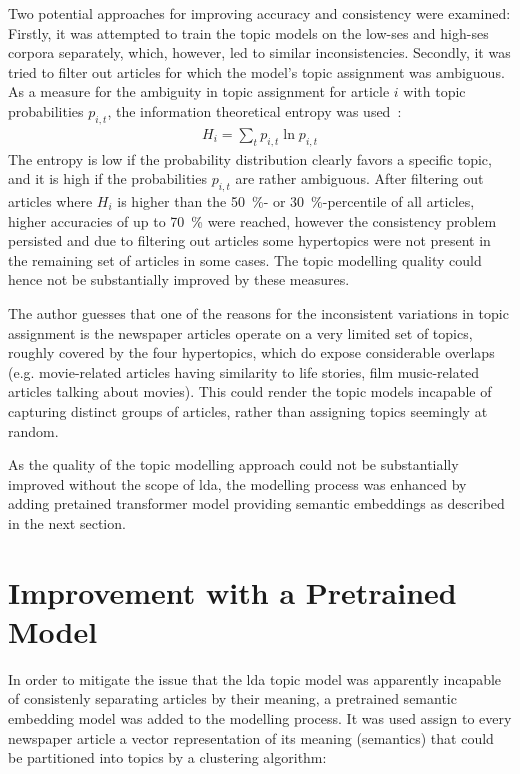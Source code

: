 Two potential approaches for improving accuracy and consistency were examined: Firstly, it was attempted to train the topic models on the low-\gls{ses} and high-\gls{ses} corpora separately, which, however, led to similar inconsistencies. Secondly, it was tried to filter out articles for which the model's topic assignment was ambiguous. As a measure for the ambiguity in topic assignment for article $i$ with topic probabilities $p_{i, t}$, the information theoretical entropy was used~\autocite{gray_entropy_2013}:
\begin{align}
    H_i = \sum_t p_{i, t} \ln p_{i,t}
\end{align}
The entropy is low if the probability distribution clearly favors a specific topic, and it is high if the probabilities $p_{i, t}$ are rather ambiguous. After filtering out articles where $H_i$ is higher than the \SI{50}{\percent}- or \SI{30}{\percent}-percentile of all articles, higher accuracies of up to \SI{70}{\percent} were reached, however the consistency problem persisted and due to filtering out articles some hypertopics were not present in the remaining set of articles in some cases. The topic modelling quality could hence not be substantially improved by these measures.

The author guesses that one of the reasons for the inconsistent variations in topic assignment is the newspaper articles operate on a very limited set of topics, roughly covered by the four hypertopics, which do expose considerable overlaps (e.g. movie-related articles having similarity to life stories, film music-related articles talking about movies). This could render the topic models incapable of capturing distinct groups of articles, rather than assigning topics seemingly at random.

As the quality of the topic modelling approach could not be substantially improved without the scope of \gls{lda}, the modelling process was enhanced by adding pretained transformer model providing semantic embeddings as described in the next section.

\section{Improvement with a Pretrained Model}
In order to mitigate the issue that the \gls{lda} topic model was apparently incapable of consistenly separating articles by their meaning, a pretrained semantic embedding model was added to the modelling process. It was used assign to every newspaper article a vector representation of its meaning (semantics) that could be partitioned into topics by a clustering algorithm:

